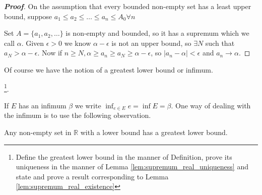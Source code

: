 \begin{proof}[\bf Proof]
On the assumption that every bounded non-empty set has a least upper bound, suppose $a_1 \leq a_2 \leq \ldots \leq a_n \leq A_0 \forall n$

Set $A = \{a_1, a_2, \ldots \}$ is non-empty and bounded, so it has a supremum which we call $\alpha$. Given $\epsilon > 0$ we know $\alpha - \epsilon$ is not an upper bound, so $\exists N$ such that $a_N > \alpha - \epsilon$. Now if $n \geq N, \alpha \geq a_n \geq a_N \geq \alpha - \epsilon$, so $|a_n - \alpha| < \epsilon$ and $a_n \rightarrow \alpha$.
\end{proof}


Of course we have the notion of a greatest lower bound or infimum.

\begin{definition}\label{def:infimum_real}
\footnote{Define the greatest lower bound in the manner of Definition, prove its uniqueness in the manner of Lemma \ref{lem:supremum_real_uniqueness} and state and prove a result corresponding to Lemma \ref{lem:supremum_real_existence}}.
\end{definition}

If $E$ has an infimum $\beta$ we write $\inf_{e \in E} e = \inf E = \beta$. One way of dealing with the infimum is to use the following observation.





\begin{theorem}\label{thm:lower_bound_in_real_implies_greatest_lower_bound}
Any non-empty set in $\mathbb{R}$ with a lower bound has a greatest lower bound.
\end{theorem}

